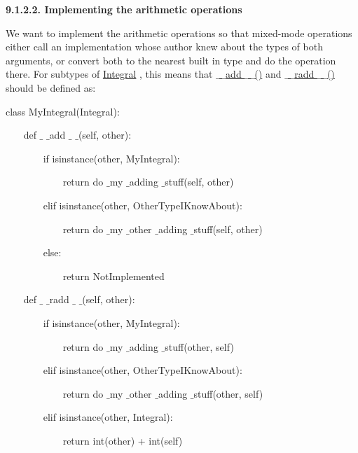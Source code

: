 \documentclass[a4paper,12pt]{report}
\begin{document}


\vspace{12pt}
\noindent 
\textbf{9.1.2.2. Implementing the arithmetic operations} \par
\noindent 
We want to implement the arithmetic operations so that mixed-mode operations either call an implementation whose author knew about the types of both arguments, or convert both to the nearest built in type and do the operation there. For subtypes of \href{https://docs.python.org/2/library/numbers.html}{Integral}
, this means that \href{https://docs.python.org/2/reference/datamodel.html}{ $  \_  $ $  \_  $add $  \_  $ $  \_  $()}
 and \href{https://docs.python.org/2/reference/datamodel.html}{ $  \_  $ $  \_  $radd $  \_  $ $  \_  $()}
 should be defined as: \par
\noindent 
class MyIntegral(Integral): \par
\noindent 
\vspace{12pt}
\noindent 
~~~ def  $  \_  $ $  \_  $add $  \_  $ $  \_  $(self, other): \par
\noindent 
~~~~~~~ if isinstance(other, MyIntegral): \par
\noindent 
~~~~~~~~~~~ return do $  \_  $my $  \_  $adding $  \_  $stuff(self, other) \par
\noindent 
~~~~~~~ elif isinstance(other, OtherTypeIKnowAbout): \par
\noindent 
~~~~~~~~~~~ return do $  \_  $my $  \_  $other $  \_  $adding $  \_  $stuff(self, other) \par
\noindent 
~~~~~~~ else: \par
\noindent 
~~~~~~~~~~~ return NotImplemented \par
\noindent 
\vspace{12pt}
\noindent 
~~~ def  $  \_  $ $  \_  $radd $  \_  $ $  \_  $(self, other): \par
\noindent 
~~~~~~~ if isinstance(other, MyIntegral): \par
\noindent 
~~~~~~~~~~~ return do $  \_  $my $  \_  $adding $  \_  $stuff(other, self) \par
\noindent 
~~~~~~~ elif isinstance(other, OtherTypeIKnowAbout): \par
\noindent 
~~~~~~~~~~~ return do $  \_  $my $  \_  $other $  \_  $adding $  \_  $stuff(other, self) \par
\noindent 
~~~~~~~ elif isinstance(other, Integral): \par
\noindent 
~~~~~~~~~~~ return int(other) + int(self) \par
\end{document}
